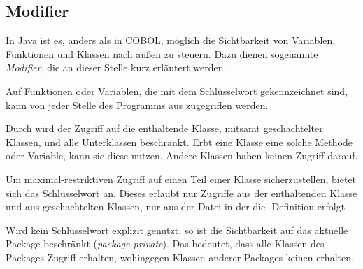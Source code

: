 \subsection{Modifier}
In Java ist es, anders als in COBOL, möglich die Sichtbarkeit von Variablen, Funktionen und Klassen nach außen zu steuern. Dazu dienen sogenannte \textit{Modifier}, die an dieser Stelle kurz erläutert werden.

Auf Funktionen oder Variablen, die mit dem Schlüsselwort  gekennzeichnet sind, kann von jeder Stelle des Programms aus zugegriffen werden.

Durch  wird der Zugriff auf die enthaltende Klasse, mitsamt geschachtelter Klassen, und alle Unterklassen beschränkt. Erbt eine Klasse eine solche Methode oder Variable, kann sie diese nutzen. Andere Klassen haben keinen Zugriff darauf.

Um maximal-restriktiven Zugriff auf einen Teil einer Klasse sicherzustellen, bietet sich das Schlüsselwort  an. Dieses erlaubt nur Zugriffe aus der enthaltenden Klasse und aus geschachtelten Klassen, \dahe nur aus der Datei in der die -Definition erfolgt.

Wird kein Schlüsselwort explizit genutzt, so ist die Sichtbarkeit auf das aktuelle Package beschränkt (\engl \textit{package-private}). Das bedeutet, dass alle Klassen des Packages Zugriff erhalten, wohingegen Klassen anderer Packages keinen erhalten.